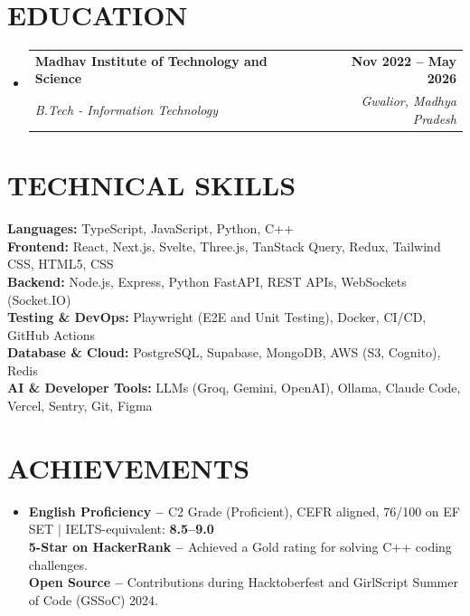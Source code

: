 \documentclass[letterpaper,11pt]{article}
\makeatletter
\newcommand{\resumeSubheading}[4]{
  \vspace{-2pt}\item
    \begin{tabular*}{1.0\textwidth}[t]{l@{\extracolsep{\fill}}r}
      \textbf{\large#1} & \textbf{\small #2} \\
      \textit{\large#3} & \textit{\small #4} \\
    \end{tabular*}\vspace{-7pt}
}
\newcommand{\resumeSubHeadingListStart}{\begin{itemize}[leftmargin=0.0in, label={}]}
\newcommand{\resumeSubHeadingListEnd}{\end{itemize}}
\newcommand{\skillLine}[2]{\textbf{\small{#1:}}{ \small{#2}} \\}
\newcommand{\achievementLine}[2]{\textbf{\small{#1 -- }}{ \small{#2}} \\}
\makeatother
\begin{document}
\vspace{-12pt}

\section{EDUCATION}
  \resumeSubHeadingListStart
    \resumeSubheading
      {Madhav Institute of Technology and Science}{Nov 2022 -- May 2026}
      {B.Tech - Information Technology}{Gwalior, Madhya Pradesh}
  \resumeSubHeadingListEnd


\section{TECHNICAL SKILLS}
 \begin{itemize}[leftmargin=0.15in, label={}]
    \small{\item{
      \skillLine{Languages}{TypeScript, JavaScript, Python, C++}
      \skillLine{Frontend}{React, Next.js, Svelte, Three.js, TanStack Query, Redux, Tailwind CSS, HTML5, CSS}
      \skillLine{Backend}{Node.js, Express, Python FastAPI, REST APIs, WebSockets (Socket.IO)}
      \skillLine{Testing \& DevOps}{Playwright (E2E and Unit Testing), Docker, CI/CD, GitHub Actions}
      \skillLine{Database \& Cloud}{PostgreSQL, Supabase, MongoDB, AWS (S3, Cognito), Redis}
      \skillLine{AI \& Developer Tools}{LLMs (Groq, Gemini, OpenAI), Ollama, Claude Code, Vercel, Sentry, Git, Figma}
    }}
 \end{itemize}

\vspace{-12pt}



\section{ACHIEVEMENTS}
 \begin{itemize}[leftmargin=0.15in, label={}]
    \item \small{
      \achievementLine{English Proficiency }{C2 Grade (Proficient), CEFR aligned, 76/100 on EF SET | IELTS-equivalent: \textbf{8.5–9.0}}
      \achievementLine{5-Star on HackerRank }{Achieved a Gold rating for solving C++ coding challenges.}
      \achievementLine{Open Source }{Contributions during Hacktoberfest and GirlScript Summer of Code (GSSoC) 2024.}
    }
 \end{itemize}
\end{document}
